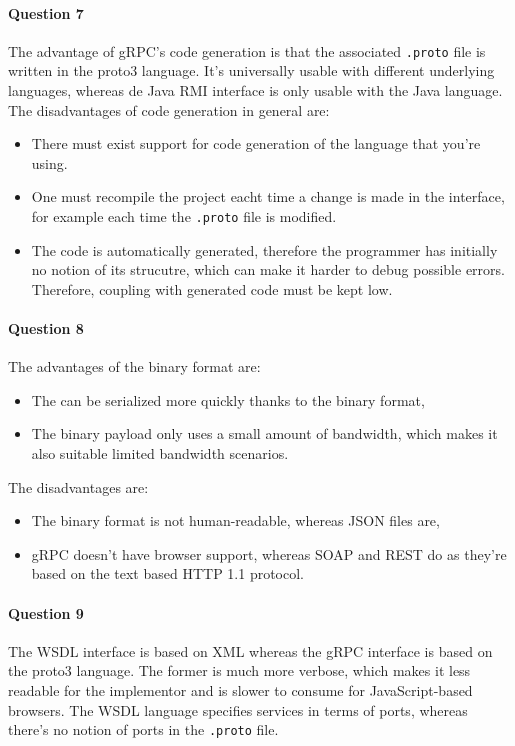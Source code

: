 \documentclass{ds-report}
\begin{document}
	\paragraph{Question 7}
	The advantage of gRPC's code generation is that the associated \texttt{.proto} file is written in the proto3 language. It's universally usable with different underlying languages, whereas de Java RMI interface is only usable with the Java language.
	The disadvantages of code generation in general are:
	\begin{itemize}
		\item There must exist support for code generation of the language that you're using.
		\item One must recompile the project eacht time a change is made in the interface, for example each time the \texttt{.proto} file is modified.
		\item The code is automatically generated, therefore the programmer has initially no notion of its strucutre, which can make it harder to debug possible errors. Therefore, coupling with generated code must be kept low.
	\end{itemize}

	\paragraph{Question 8}
	The advantages of the binary format are:
	\begin{itemize}
		\item The can be serialized more quickly thanks to the binary format,
		\item The binary payload only uses a small amount of bandwidth, which makes it also suitable limited bandwidth scenarios.
	\end{itemize}
	The disadvantages are:
	\begin{itemize}
		\item The binary format is not human-readable, whereas JSON files are,
		\item gRPC doesn't have browser support, whereas SOAP and REST do as they're based on the text based HTTP 1.1 protocol.
	\end{itemize}
	
	\paragraph{Question 9}
	The WSDL interface is based on XML whereas the gRPC interface is based on the proto3 language. The former is much more verbose, which makes it less readable for the implementor and is slower to consume for JavaScript-based browsers. The WSDL language specifies services in terms of ports, whereas there's no notion of ports in the \texttt{.proto} file. 
	
\end{document}
